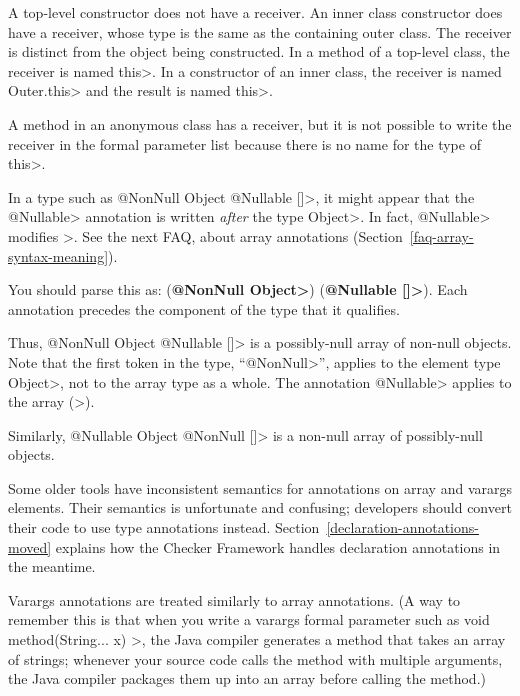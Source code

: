 A top-level constructor does not have a receiver.  An inner class
constructor does have a receiver, whose type is the same as the containing
outer class.  The receiver is distinct from the object being constructed.
In a method of a top-level class, the receiver is named \<this>.  In a
constructor of an inner class, the receiver is named \<Outer.this> and the
result is named \<this>.

A method in an anonymous class has a receiver, but it is not possible to
write the receiver in the formal parameter list because there is no name
for the type of \<this>.



In a type such as \<@NonNull Object @Nullable []>, it might appear that the
\<@Nullable> annotation is written \emph{after} the type \<Object>.  In
fact, \<@Nullable> modifies \<[]>.  See the next FAQ, about array
annotations (Section~\ref{faq-array-syntax-meaning}).



You should parse this as:
(\textbf{\<@NonNull Object>}) (\textbf{\<@Nullable []>}).
Each annotation precedes the component of the type that it qualifies.

Thus,
\<@NonNull Object @Nullable []> is a possibly-null array of non-null
objects.  Note that the first token in the type,
``\<@NonNull>'', applies to the element
type \<Object>, not to the array type as a whole.  The annotation \<@Nullable> applies to the
array (\<[]>).

Similarly,
\<@Nullable Object @NonNull []> is a non-null array of possibly-null
objects.

Some older tools have inconsistent semantics for annotations on array and
varargs elements.  Their semantics is unfortunate and confusing; developers
should convert their code to use type annotations instead.
Section~\ref{declaration-annotations-moved} explains how the Checker
Framework handles declaration annotations in the meantime.



Varargs annotations are treated similarly to array annotations.
(A way to remember this is that
when you write a varargs formal parameter such as
\<void method(String... x) \ttlcb\ttrcb>, the Java compiler generates a
method that takes an array of strings; whenever your source code calls the
method with multiple arguments, the Java compiler packages them up into an
array before calling the method.)

